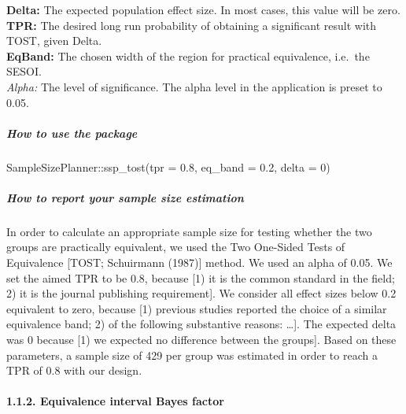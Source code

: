 \documentclass[
  english,
  man,floatsintext]{apa6}
\newenvironment{Shaded}{\begin{snugshade}}{\end{snugshade}}
\newcommand{\AttributeTok}[1]{\textcolor[rgb]{0.77,0.63,0.00}{#1}}
\newcommand{\DecValTok}[1]{\textcolor[rgb]{0.00,0.00,0.81}{#1}}
\newcommand{\FloatTok}[1]{\textcolor[rgb]{0.00,0.00,0.81}{#1}}
\newcommand{\FunctionTok}[1]{\textcolor[rgb]{0.00,0.00,0.00}{#1}}
\newcommand{\NormalTok}[1]{#1}
\newcommand{\SpecialCharTok}[1]{\textcolor[rgb]{0.00,0.00,0.00}{#1}}
\let\oldparagraph\paragraph
\renewcommand{\paragraph}[1]{\oldparagraph{#1}\mbox{}}
\let\oldsubparagraph\subparagraph
\renewcommand{\subparagraph}[1]{\oldsubparagraph{#1}\mbox{}}
\begin{document}
\textbf{Delta:} The expected population effect size. In most cases, this value will be zero.\\
\textbf{TPR:} The desired long run probability of obtaining a significant result with TOST, given Delta.\\
\textbf{EqBand:} The chosen width of the region for practical equivalence, i.e.~the SESOI.\\
\emph{Alpha:} The level of significance. The alpha level in the application is preset to 0.05.\\

\hypertarget{how-to-use-the-package}{%
\subparagraph{How to use the package}\label{how-to-use-the-package}}

\begin{Shaded}
\begin{Highlighting}[]
\NormalTok{SampleSizePlanner}\SpecialCharTok{::}\FunctionTok{ssp\_tost}\NormalTok{(}\AttributeTok{tpr =} \FloatTok{0.8}\NormalTok{, }\AttributeTok{eq\_band =} \FloatTok{0.2}\NormalTok{, }\AttributeTok{delta =} \DecValTok{0}\NormalTok{)}
\end{Highlighting}
\end{Shaded}

\hypertarget{how-to-report-your-sample-size-estimation}{%
\subparagraph{How to report your sample size estimation}\label{how-to-report-your-sample-size-estimation}}

In order to calculate an appropriate sample size for testing whether the two groups are practically equivalent, we used the Two One-Sided Tests of Equivalence {[}TOST; Schuirmann (1987){]} method. We used an alpha of 0.05. We set the aimed TPR to be 0.8, because {[}1) it is the common standard in the field; 2) it is the journal publishing requirement{]}. We consider all effect sizes below 0.2 equivalent to zero, because {[}1) previous studies reported the choice of a similar equivalence band; 2) of the following substantive reasons: \ldots{]}. The expected delta was 0 because {[}1) we expected no difference between the groups{]}. Based on these parameters, a sample size of 429 per group was estimated in order to reach a TPR of 0.8 with our design.

\hypertarget{equivalence-interval-bayes-factor}{%
\paragraph{1.1.2. Equivalence interval Bayes factor}\label{equivalence-interval-bayes-factor}}
\end{document}
